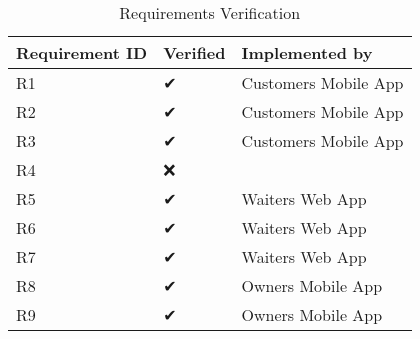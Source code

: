 
\begin{table}[h]
\centering
\begin{tabular}{|l|l|l|}
\hline
{\bf Requirement ID} & {\bf Verified} & {\bf Implemented by} \\ \hline
R1                   & ✔              & Customers Mobile App \\ \hline
R2                   & ✔              & Customers Mobile App \\ \hline
R3                   & ✔              & Customers Mobile App \\ \hline
R4                   & ❌              &                      \\ \hline
R5                   & ✔              & Waiters Web App      \\ \hline
R6                   & ✔              & Waiters Web App      \\ \hline
R7                   & ✔              & Waiters Web App      \\ \hline
R8                   & ✔              & Owners Mobile App    \\ \hline
R9                   & ✔              & Owners Mobile App    \\ \hline
\end{tabular}
\caption{Requirements Verification}
\label{table:requirements_verification}
\end{table}
